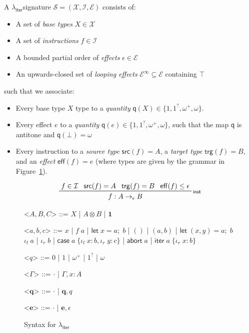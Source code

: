 \documentclass[acmsmall,screen,review]{acmart}
\newcommand{\mc}[1]{\ensuremath{\mathcal{#1}}}
\newcommand{\mb}[1]{\ensuremath{\mathbf{#1}}}
\newcommand{\ms}[1]{\ensuremath{\mathsf{#1}}}
\newcommand{\lto}{:}
\newcommand{\linl}[1]{\iota_l\;{#1}}
\newcommand{\linr}[1]{\iota_r\;{#1}}
\newcommand{\labort}[1]{\ms{abort}\;{#1}}
\newcommand{\letexpr}[3]{\ensuremath{\ms{let}\;#1 = #2;\;#3}}
\newcommand{\caseexpr}[5]{\ms{case}\;#1\;\{\linl{#2} \lto #3, \linr{#4} \lto #5\}}
\newcommand{\liter}[3]{\ms{iter}\;#1\;\{ \linr{#2} \lto #3 \}}
\newcommand{\rle}[1]{{\scriptsize\textsf{#1}}}
\newcommand{\subiterssa}{\(\lambda_{\ms{iter}}\)}
\newcommand{\zeroq}{0}
\newcommand{\oneq}{1}
\newcommand{\delq}{1^?}
\newcommand{\cpyq}{\omega^+}
\newcommand{\topq}{\omega}
\begin{document}
\begin{definition}[\subiterssa-signature]
  A \subiterssa signature $\mc{S} = (\mc{X}, \mc{I}, \mc{E})$ consists of:
  \begin{itemize}
    \item A set of \emph{base types} $X \in \mc{X}$
    \item A set of \emph{instructions} $f \in \mc{I}$
    \item A bounded 
    partial order
    of \emph{effects} $\epsilon \in \mc{E}$
    \item An upwards-closed set of \emph{looping effects} $\mc{E}^\infty \subseteq \mc{E}$
    containing $\top$
  \end{itemize}
  such that we associate:
  \begin{itemize}
    \item Every base type $X$ type to a \emph{quantity} $\ms{q}(X) \in \{1, \delq, \cpyq, \topq\}$.
    \item Every effect $e$ to a \emph{quantity} $\ms{q}(e) \in \{1, \delq, \cpyq, \topq\}$, such
    that the map $\ms{q}$ is antitone and $\ms{q}(\bot) = \topq$
    \item Every instruction to a \emph{source type} $\ms{src}(f) = A$, a \emph{target type}
    $\ms{trg}(f) = B$, and an \emph{effect} $\ms{eff}(f) = e$ (where types are given by the grammar
    in Figure~\ref{fig:subiterssa-syntax}).
  \end{itemize}
\end{definition}

\begin{gather*}
  \prftree[r]{\rle{inst}}
    {f \in \mc{I}}
    {\ms{src}(f) = A}
    {\ms{trg}(f) = B}
    {\ms{eff}(f) \leq \epsilon}
    {f : A \to_\epsilon B}
\end{gather*}

\begin{figure}
  \begin{grammar}
    <\(A, B, C\)> ::= 
    \(X\)
    \;|\; \(A \otimes B\)
    \;|\; \(\mathbf{1}\)

    <\(a, b, c\)> ::=
    \(x\)
    \;|\; \(f\;a\)
    \;|\; \(\letexpr{x}{a}{b}\)
    \;|\; \(()\)
    \;|\; \((a, b)\)
    \;|\; \(\letexpr{(x, y)}{a}{b}\)
    \alt  \(\linl{a}\)
    \;|\; \(\linr{b}\)
    \;|\; \(\caseexpr{a}{x}{b}{y}{c}\)
    \;|\; \(\labort{a}\)
    \;|\; \(\liter{a}{x}{b}\)
    
    <\(q\)> ::= \(\zeroq\) | \(\oneq\) | \(\cpyq\) | \(\delq\) | \(\topq\)

    <\(\Gamma\)> ::= \(\cdot\) \;|\; \(\Gamma, x : A\)

    <\(\mb{q}\)> ::= \(\cdot\) \;|\; \(\mb{q}, q\)

    <\(\mb{e}\)> ::= \(\cdot\) \;|\; \(\mb{e}, \epsilon\)
  \end{grammar}
  \caption{Syntax for \subiterssa}
  \label{fig:subiterssa-syntax}
\end{figure}
\end{document}
